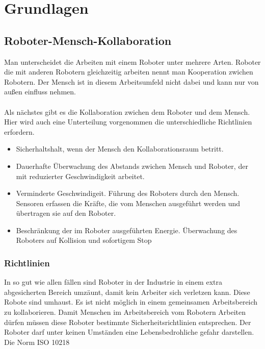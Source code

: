 \chapter{Grundlagen}

\section{Roboter-Mensch-Kollaboration}
\label{sec:roboter-mensch-kollaboration_gru}

Man unterscheidet die Arbeiten mit einem Roboter unter mehrere Arten.
Roboter die mit anderen Robotern gleichzeitig arbeiten nennt man Kooperation zwichen Robotern.
Der Mensch ist in diesem Arbeitsumfeld nicht dabei und kann nur von außen einfluss nehmen.
\\\\
Als nächstes gibt es die Kollaboration zwichen dem Roboter und dem Mensch. 
Hier wird auch eine Unterteilung vorgenommen die unterschiedliche Richtlinien erfordern.

\begin{itemize}
\item Sicherhaltshalt, wenn der Mensch den Kollaborationsraum betritt.
\item Dauerhafte Überwachung des Abstands zwichen Mensch und Roboter, der mit reduzierter Geschwindigkeit arbeitet.
\item Verminderte Geschwindigeit. Führung des Roboters durch den Mensch. Sensoren erfassen die Kräfte, die vom Menschen ausgeführt werden und übertragen sie auf den Roboter.
\item Beschränkung der im Roboter ausgeführten Energie. Überwachung des Roboters auf Kollision und sofortigem Stop
\end{itemize}

\subsection{Richtlinien}
\label{kol_richtlinien_gru}

In so gut wie allen fällen sind Roboter in der Industrie in einem extra abgesicherten Bereich umzäunt, damit kein Arbeiter sich verletzen kann. Diese Robote sind umhaust. Es ist nicht möglich in einem gemeinsamen Arbeitsbereich zu kollaborieren. 
Damit Menschen im Arbeitsbereich vom Robotern Arbeiten dürfen müssen diese Roboter bestimmte Sicherheitsrichtlinien entsprechen.
Der Roboter darf unter keinen Umständen eine Lebensbedrohliche gefahr darstellen. Die Norm \ac{ISO} 10218

